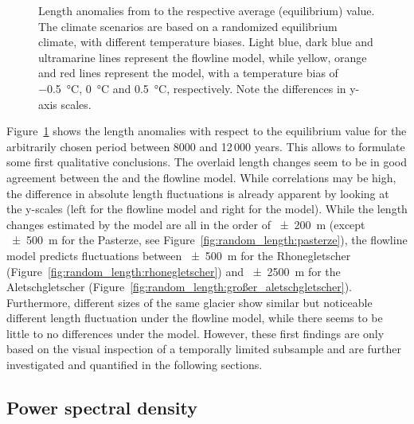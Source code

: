 \begin{figure}[htp]
\begin{subfigure}[b]{0.48\textwidth}
            \end{subfigure}

            \caption{Length anomalies from to the respective average (equilibrium) value. The climate scenarios are based on a randomized equilibrium climate, with different temperature biases. Light blue, dark blue and ultramarine lines represent the flowline model, while yellow, orange and red lines represent the \vas{} model, with a temperature bias of \SI{-.5}{\celsius}, \SI{0}{\celsius} and \SI{+.5}{\celsius}, respectively. Note the differences in y-axis scales.}
            \label{fig:random_length} 
          \end{figure}

        Figure~\ref{fig:random_length} shows the length anomalies with respect to the equilibrium value for the arbitrarily chosen period between 8000 and 12\,000 years. This allows to formulate some first qualitative conclusions. The overlaid length changes seem to be in good agreement between the \vas{} and the flowline model. While correlations may be high, the difference in absolute length fluctuations is already apparent by looking at the y-scales (left for the flowline model and right for the \vas{} model). While the length changes estimated by the \vas{} model are all in the order of \SI{\pm200}{\meter} (except \SI{\pm500}{\meter} for the Pasterze, see Figure~\ref{fig:random_length:pasterze}), the flowline model predicts fluctuations between \SI{\pm500}{\meter} for the Rhonegletscher (Figure~\ref{fig:random_length:rhonegletscher}) and \SI{\pm2500}{\meter} for the Aletschgletscher (Figure~\ref{fig:random_length:großer_aletschgletscher}). Furthermore, different sizes of the same glacier show similar but noticeable different length fluctuation under the flowline model, while there seems to be little to no differences under the \vas{} model. However, these first findings are only based on the visual inspection of a temporally limited subsample and are further investigated and quantified in the following sections.

        
    
    
    \subsection{Power spectral density} %
    \label{sub:power_spectral_density_results}

